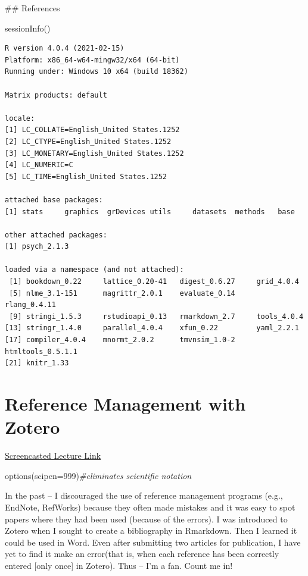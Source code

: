 \documentclass[
  english,
]{book}
\newenvironment{Shaded}{\begin{snugshade}}{\end{snugshade}}
\newcommand{\AttributeTok}[1]{\textcolor[rgb]{0.77,0.63,0.00}{#1}}
\newcommand{\CommentTok}[1]{\textcolor[rgb]{0.56,0.35,0.01}{\textit{#1}}}
\newcommand{\DecValTok}[1]{\textcolor[rgb]{0.00,0.00,0.81}{#1}}
\newcommand{\FunctionTok}[1]{\textcolor[rgb]{0.00,0.00,0.00}{#1}}
\newcommand{\NormalTok}[1]{#1}
\begin{document}
\#\# References

\begin{Shaded}
\begin{Highlighting}[]
\FunctionTok{sessionInfo}\NormalTok{()}
\end{Highlighting}
\end{Shaded}

\begin{verbatim}
R version 4.0.4 (2021-02-15)
Platform: x86_64-w64-mingw32/x64 (64-bit)
Running under: Windows 10 x64 (build 18362)

Matrix products: default

locale:
[1] LC_COLLATE=English_United States.1252 
[2] LC_CTYPE=English_United States.1252   
[3] LC_MONETARY=English_United States.1252
[4] LC_NUMERIC=C                          
[5] LC_TIME=English_United States.1252    

attached base packages:
[1] stats     graphics  grDevices utils     datasets  methods   base     

other attached packages:
[1] psych_2.1.3

loaded via a namespace (and not attached):
 [1] bookdown_0.22     lattice_0.20-41   digest_0.6.27     grid_4.0.4       
 [5] nlme_3.1-151      magrittr_2.0.1    evaluate_0.14     rlang_0.4.11     
 [9] stringi_1.5.3     rstudioapi_0.13   rmarkdown_2.7     tools_4.0.4      
[13] stringr_1.4.0     parallel_4.0.4    xfun_0.22         yaml_2.2.1       
[17] compiler_4.0.4    mnormt_2.0.2      tmvnsim_1.0-2     htmltools_0.5.1.1
[21] knitr_1.33       
\end{verbatim}

\hypertarget{Zotero}{%
\chapter{Reference Management with Zotero}\label{Zotero}}

\href{HTTPS://SPU.HOSTED.PANOPTO.COM/PANOPTO/PAGES/VIEWER.ASPX?ID=CB5B69D1-EDCC-45A5-97B1-AC250189047A}{Screencasted Lecture Link}

\begin{Shaded}
\begin{Highlighting}[]
\FunctionTok{options}\NormalTok{(}\AttributeTok{scipen=}\DecValTok{999}\NormalTok{)}\CommentTok{\#eliminates scientific notation}
\end{Highlighting}
\end{Shaded}

In the past -- I discouraged the use of reference management programs (e.g., EndNote, RefWorks) because they often made mistakes and it was easy to spot papers where they had been used (because of the errors). I was introduced to Zotero when I sought to create a bibliography in Rmarkdown. Then I learned it could be used in Word. Even after submitting two articles for publication, I have yet to find it make an error(that is, when each reference has been correctly entered {[}only once{]} in Zotero). Thus -- I'm a fan. Count me in!
\end{document}
